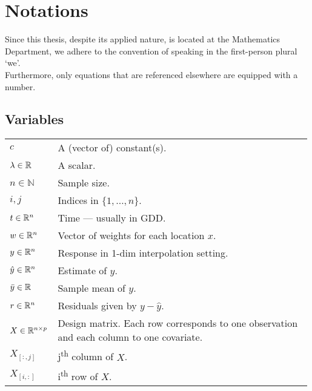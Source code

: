 \chapter*{\vspace{-3.5cm} Notations}
\label{c:Notation}
\vspace{-0.6cm}
Since this thesis, despite its applied nature, is located at the Mathematics Department, we adhere to the convention of speaking in the first-person plural `we'.\\
Furthermore, only equations that are referenced elsewhere are equipped with a number.

\section*{Variables}\vspace{-0.3cm}
\renewcommand{\arraystretch}{1.3} %
\begin{longtable}{p{0.12\linewidth} p{0.87\linewidth}}
$c$		& A (vector of) constant(s).\\
$\lambda \in \mathbb{R}$		& A scalar.\\
$n\in \mathbb{N}$		& Sample size.\\
$i,j$		& Indices in $\{1,\dots,n\}$.\\
$t\in \mathbb{R}^n$		& Time --- usually in GDD.\\
$w \in \mathbb{R}^n$		& Vector of weights for each location $x$.\\
$y\in \mathbb{R}^n$		& Response in 1-dim interpolation setting.\\
$\hat y\in \mathbb{R}^n$		& Estimate of $y$.\\
$\bar y\in \mathbb{R}$		& Sample mean of $y$.\\
$r \in \mathbb{R}^n$		& Residuals given by $y - \hat y$.\\
$X\in\mathbb{R}^{n\times p}$ & Design matrix. Each row corresponds to one observation and each column to one covariate.\\
$X_{[:,j]}$ 	& j\textsuperscript{th} column of $X$.\\
$X_{[i,:]}$ 	& i\textsuperscript{th} row of $X$.
\end{longtable}

